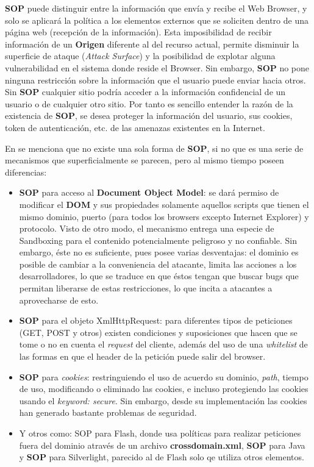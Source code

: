     \textbf{SOP} puede distinguir entre la información que envía y recibe el Web Browser, y solo se aplicará la política a los elementos externos que se soliciten dentro de una página web (recepción de la información). Esta imposibilidad de recibir información de un \textbf{Origen} diferente al del recurso actual, permite disminuir la superficie de ataque (\textit{Attack Surface}) y la posibilidad de explotar alguna vulnerabilidad en el sistema donde reside el Browser. Sin embargo, \textbf{SOP} no pone ninguna restricción sobre la información que el usuario puede enviar hacia otros. Sin \textbf{SOP} cualquier sitio podría acceder a la información confidencial de un usuario o de cualquier otro sitio. Por tanto es sencillo entender la razón de la existencia de \textbf{SOP}, se desea proteger la información del usuario, sus cookies, token de autenticación, etc. de las amenazas existentes en la Internet.


    En \cite{Zalewsk08} se menciona que no existe una sola forma de \textbf{SOP}, si no que es una serie de mecanismos que superficialmente se parecen, pero al mismo tiempo poseen diferencias:

    \begin{itemize}
        \item \textbf{SOP} para acceso al \textbf{Document Object Model}: se dará permiso de modificar el \textbf{DOM} y sus propiedades solamente aquellos scripts que tienen el mismo dominio, puerto (para todos los browsers excepto Internet Explorer) y protocolo. Visto de otro modo, el mecanismo entrega una especie de Sandboxing para el contenido potencialmente peligroso y no confiable. Sin embargo, éste no es suficiente, pues posee varias desventajas: el dominio es posible de cambiar a la conveniencia del atacante, limita las acciones a los desarrolladores, lo que se traduce en que éstos tengan que buscar bugs que permitan liberarse de estas restricciones, lo que incita a atacantes a aprovecharse de esto.
        \item \textbf{SOP} para el objeto XmlHttpRequest: para diferentes tipos de peticiones (GET, POST y otros) existen condiciones y suposiciones que hacen que se tome o no en cuenta el \textit{request} del cliente, además del uso de una \textit{whitelist} de las formas en que el header de la petición puede salir del browser.
        \item \textbf{SOP} para \textit{cookies}: restringuiendo el uso de acuerdo su dominio, \textit{path}, tiempo de uso, modificando o eliminado las cookies, e incluso protegiendo las cookies usando el \textit{keyword: secure}. Sin embargo, desde su implementación las cookies han generado bastante problemas de seguridad.
        \item Y otros como: {SOP} para Flash, donde usa políticas para realizar peticiones fuera del dominio através de un archivo \textbf{crossdomain.xml}, \textbf{SOP} para Java y \textbf{SOP} para Silverlight, parecido al de Flash solo qe utiliza otros elementos.
    \end{itemize}

